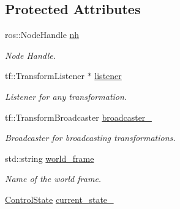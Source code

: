 \subsection*{Protected Attributes}
\begin{DoxyCompactItemize}
\item 
ros\+::\+Node\+Handle \hyperlink{classController_a24e3d3c2536f6ed29018bad1fd53dae2}{nh}\hypertarget{classController_a24e3d3c2536f6ed29018bad1fd53dae2}{}\label{classController_a24e3d3c2536f6ed29018bad1fd53dae2}

\begin{DoxyCompactList}\small\item\em Node Handle. \end{DoxyCompactList}\item 
tf\+::\+Transform\+Listener $\ast$ \hyperlink{classController_afea373f808d583e4ad613f119439a8f5}{listener}\hypertarget{classController_afea373f808d583e4ad613f119439a8f5}{}\label{classController_afea373f808d583e4ad613f119439a8f5}

\begin{DoxyCompactList}\small\item\em Listener for any transformation. \end{DoxyCompactList}\item 
tf\+::\+Transform\+Broadcaster \hyperlink{classController_a934f19927283d24fbf79b5d62e23bed3}{broadcaster\+\_\+}\hypertarget{classController_a934f19927283d24fbf79b5d62e23bed3}{}\label{classController_a934f19927283d24fbf79b5d62e23bed3}

\begin{DoxyCompactList}\small\item\em Broadcaster for broadcasting transformations. \end{DoxyCompactList}\item 
std\+::string \hyperlink{classController_ae01171e69d9b735e44964662275fc77c}{world\+\_\+frame}\hypertarget{classController_ae01171e69d9b735e44964662275fc77c}{}\label{classController_ae01171e69d9b735e44964662275fc77c}

\begin{DoxyCompactList}\small\item\em Name of the world frame. \end{DoxyCompactList}\item 
\hyperlink{structController_1_1ControlState}{Control\+State} \hyperlink{classController_aaca736f25e7da33272ded507e0c8057f}{current\+\_\+state\+\_\+}\hypertarget{classController_aaca736f25e7da33272ded507e0c8057f}{}\label{classController_aaca736f25e7da33272ded507e0c8057f}


\end{DoxyCompactItemize}

